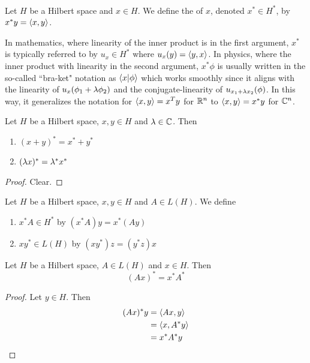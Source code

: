 \documentclass{book}
\begin{document}
\begin{defn} \ld{} \\
	Let $H$ be a Hilbert space and $x \in H$. We define the  of $x$, denoted $x^* \in H^*$, by $x^* y = \langle x, y \rangle$. 
\end{defn}

\begin{note}
	In mathematics, where linearity of the inner product is in the first argument, $x^{*}$ is typically referred to by $u_{x} \in H^{*} $ where $u_{x}(y) = \langle y, x\rangle$. In physics, where the inner product with linearity in the second argument, $x^{*} \phi$ is usually written in the so-called ``bra-ket" notation as $\langle x | \phi \rangle$ which works smoothly since it aligns with the linearity of $u_{x}(\phi_1 + \lambda \phi_2)$ and the conjugate-linearity of $u_{x_1 + \lambda x_2}(\phi)$. In this way, it generalizes the notation for $\langle x, y\rangle = x^T y$ for $\mathbb{R}^n$ to $\langle x, y\rangle = x^*y$ for $\mathbb{C}^n$. 
\end{note}

\begin{ex} \lex{}
	Let $H$ be a Hilbert space, $x, y \in H$ and $\lambda \in \mathbb{C}$. Then 
	\begin{enumerate}
		\item $(x + y)^* =  x^* + y^*$
		\item $(\lambda x)^* = \lambda^* x^*$
	\end{enumerate}
\end{ex}

\begin{proof}
	Clear.
\end{proof}

\begin{defn} \ld{}
	Let $H$ be a Hilbert space, $x, y \in H$ and $A \in L(H)$. We define 
	\begin{enumerate}
		\item $x^* A \in H^*$ by $(x^*A) y = x^*(A y)$
		\item $x y^* \in L(H)$ by $(x y^*) z = (y^*z) x$
	\end{enumerate}
\end{defn}

\begin{ex} \lex{}
	Let $H$ be a Hilbert space, $A \in L(H)$ and $x \in H$. Then $$(A x)^*= x^*A^*$$
\end{ex}

\begin{proof}
	Let $y \in H$. Then 
	\begin{align*}
		(Ax)^*	y 
		&= \langle Ax, y \rangle \\
		&= \langle x, A^* y \rangle \\
		&= x^*A^* y
	\end{align*}
\end{proof}
\end{document}
